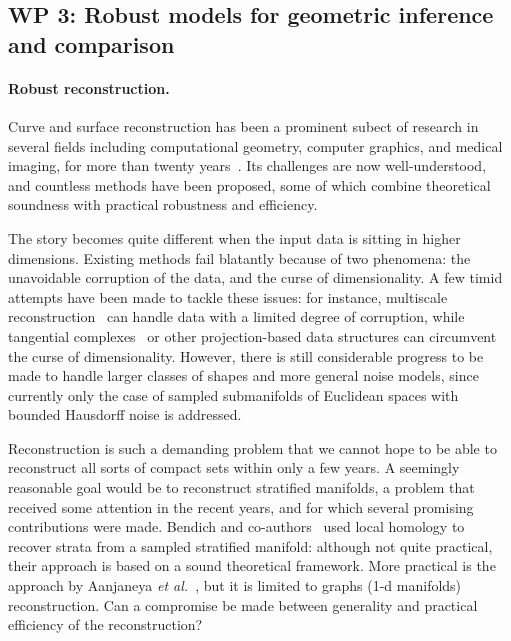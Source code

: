 \subsection*{WP 3:  Robust models for geometric inference and comparison} 






\paragraph{Robust reconstruction.}

Curve and surface reconstruction has been a prominent subect of
research in several fields including computational geometry, computer
graphics, and medical imaging, for more than twenty
years~\cite{dey-csr-2007}. Its challenges are now well-understood, and
countless methods have been proposed, some of which combine
theoretical soundness with practical robustness and efficiency.

The story becomes quite different when the input data is sitting in
higher dimensions. Existing methods fail blatantly because of two
phenomena: the unavoidable corruption of the data, and the curse of
dimensionality. A few timid attempts have been made to tackle these
issues: for instance, multiscale
reconstruction~\cite{geometrica-bgo-09} can handle data with a limited
degree of corruption, while tangential
complexes~\cite{geometrica-7142i} or other projection-based data
structures can circumvent the curse of dimensionality. However, there
is still considerable progress to be made to handle larger classes of
shapes and more general noise models, since currently only the case of
sampled submanifolds of Euclidean spaces with bounded Hausdorff noise
is addressed.

Reconstruction is such a demanding problem that we cannot hope to be
able to reconstruct all sorts of compact sets within only a few
years. A seemingly reasonable goal would be to reconstruct stratified
manifolds, a problem that received some attention in the recent years,
and for which several promising contributions were made.  Bendich and
co-authors~\cite{bendich-PhD,bendich-strat1,bendich-strat2} used
local homology to recover strata from a sampled stratified manifold:
although not quite practical, their approach is based on a sound
theoretical framework. More practical is the approach by Aanjaneya
{\em et al.}~\cite{metric-graphs-reconstruction}, but it is limited to
graphs (1-d manifolds) reconstruction. Can a compromise be made
between generality and practical efficiency of the reconstruction?

